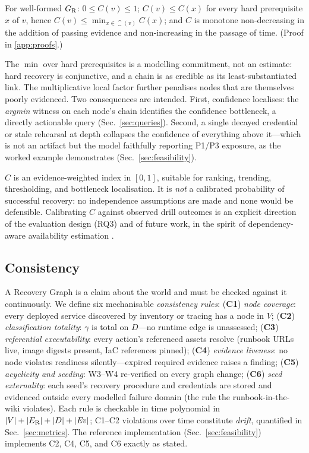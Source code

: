 \begin{proposition}
\label{prop:weakestlink}
For well-formed $G_{\mathrm{R}}$: $0 \leq C(v) \leq 1$; $C(v) \leq C(x)$ for every hard prerequisite $x$ of $v$, hence $C(v) \leq \min_{x \in \closure(v)} C(x)$; and $C$ is monotone non-decreasing in the addition of passing evidence and non-increasing in the passage of time. (Proof in \ref{app:proofs}.)
\end{proposition}

The $\min$ over hard prerequisites is a modelling commitment, not an estimate: hard recovery is conjunctive, and a chain is as credible as its least-substantiated link. The multiplicative local factor further penalises nodes that are themselves poorly evidenced. Two consequences are intended. First, confidence localises: the \emph{argmin} witness on each node's chain identifies the confidence bottleneck, a directly actionable query (Sec.~\ref{sec:queries}). Second, a single decayed credential or stale rehearsal at depth collapses the confidence of everything above it---which is not an artifact but the model faithfully reporting P1/P3 exposure, as the worked example demonstrates (Sec.~\ref{sec:feasibility}).

\begin{remark}
\label{rem:notprob}
$C$ is an evidence-weighted index in $[0,1]$, suitable for ranking, trending, thresholding, and bottleneck localisation. It is \emph{not} a calibrated probability of successful recovery: no independence assumptions are made and none would be defensible. Calibrating $C$ against observed drill outcomes is an explicit direction of the evaluation design (RQ3) and of future work, in the spirit of dependency-aware availability estimation \citep{treynor2017calculus}.
\end{remark}

\subsection{Consistency}
\label{sec:consistency}

A Recovery Graph is a claim about the world and must be checked against it continuously. We define six mechanisable \emph{consistency rules}: (\textbf{C1}) \emph{node coverage}: every deployed service discovered by inventory or tracing has a node in $V$; (\textbf{C2}) \emph{classification totality}: $\gamma$ is total on $D$---no runtime edge is unassessed; (\textbf{C3}) \emph{referential executability}: every action's referenced assets resolve (runbook URLs live, image digests present, IaC references pinned); (\textbf{C4}) \emph{evidence liveness}: no node violates readiness silently---expired required evidence raises a finding; (\textbf{C5}) \emph{acyclicity and seeding}: W3--W4 re-verified on every graph change; (\textbf{C6}) \emph{seed externality}: each seed's recovery procedure and credentials are stored and evidenced outside every modelled failure domain (the rule the runbook-in-the-wiki violates). Each rule is checkable in time polynomial in $|V| + |E_{\mathrm{R}}| + |D| + |\mathit{Ev}|$; C1--C2 violations over time constitute \emph{drift}, quantified in Sec.~\ref{sec:metrics}. The reference implementation (Sec.~\ref{sec:feasibility}) implements C2, C4, C5, and C6 exactly as stated.
